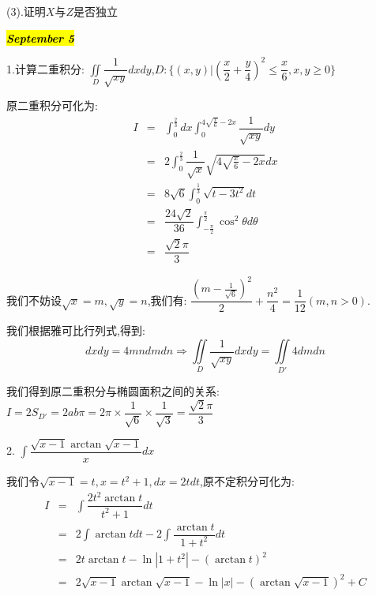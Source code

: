 (3).证明$X$与$Z$是否独立
\begin{solution}
	
\end{solution}

\hl{\textbf{\textit{September 5}}}

1.计算二重积分:  $\iint\limits_{D}\dfrac{1}{\sqrt{xy}}dxdy$,$D:\{(x,y)|(\dfrac{x}{2}+\dfrac{y}{4})^2\leq \dfrac{x}{6},x,y\geq 0\}$
\begin{solution}
	原二重积分可化为:  
	\begin{eqnarray*}
		I&=&\int_{0}^{\frac{2}{3}}dx\int_{0}^{4\sqrt{\frac{x}{6}}-2x}\dfrac{1}{\sqrt{xy}}dy\\
		&=&2\int_{0}^{\frac{2}{3}}\dfrac{1}{\sqrt{x}}\sqrt{4\sqrt{\frac{x}{6}}-2x}dx\\
		&=&8\sqrt{6}\int_{0}^{\frac{1}{3}}\sqrt{t-3t^2}dt\\
		&=&\dfrac{24\sqrt{2}}{36}\int_{-\frac{\pi}{2}}^{\frac{\pi}{2}}\cos^2\theta d\theta\\
		&=&\dfrac{\sqrt{2}\pi}{3}
	\end{eqnarray*}
\end{solution}
\begin{anymark}[注]
	我们不妨设$\sqrt{x}=m,\sqrt{y}=n$,我们有:  $\dfrac{(m-\frac{1}{\sqrt{6}})^2}{2}+\dfrac{n^2}{4}=\dfrac{1}{12}(m,n>0)$.
	
	我们根据雅可比行列式,得到:  
	$$dxdy=4mndmdn\Rightarrow \iint\limits_{D}\dfrac{1}{\sqrt{xy}}dxdy=\iint\limits_{D'}4dmdn$$
	
	我们得到原二重积分与椭圆面积之间的关系:  $I=2S_{D'}=2ab\pi=2\pi\times\dfrac{1}{\sqrt{6}}\times\dfrac{1}{\sqrt{3}}=\dfrac{\sqrt{2}\pi}{3}$
\end{anymark}

2. $\int \dfrac{\sqrt{x-1}\arctan \sqrt{x-1}}{x}dx$
\begin{solution}

	我们令$\sqrt{x-1}=t,x=t^2+1,dx=2tdt$,原不定积分可化为:  
	\begin{eqnarray*}
		I&=&\int \dfrac{2t^2\arctan t}{t^2+1}dt\\
		&=&2\int \arctan tdt-2\int\dfrac{\arctan t}{1+t^2}dt\\
		&=&2t\arctan t-\ln|1+t^2|-(\arctan t)^2\\
		&=&2\sqrt{x-1}\arctan \sqrt{x-1}-\ln|x|-(\arctan\sqrt{x-1})^2+C
	\end{eqnarray*}
\end{solution}

